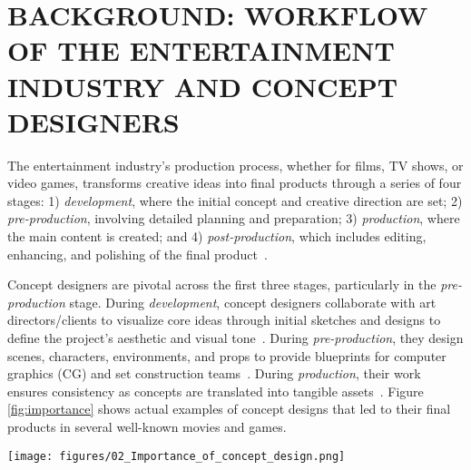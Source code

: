 \section{BACKGROUND: WORKFLOW OF THE ENTERTAINMENT INDUSTRY AND CONCEPT DESIGNERS}
The entertainment industry's production process, whether for films, TV shows, or video games, transforms creative ideas into final products through a series of four stages: 1) \textit{development}, where the initial concept and creative direction are set; 2) \textit{pre-production}, involving detailed planning and preparation; 3) \textit{production}, where the main content is created; and 4) \textit{post-production}, which includes editing, enhancing, and polishing of the final product~\cite{gameworkshop2018, bigbadWorld2015, directing2020, Singh2023Artificial, filmmaker2019}.

Concept designers are pivotal across the first three stages, particularly in the \textit{pre-production} stage. During \textit{development}, concept designers collaborate with art directors/clients to visualize core ideas through initial sketches and designs to define the project's aesthetic and visual tone~\cite{artofgame2008}. During \textit{pre-production}, they design scenes, characters, environments, and props to provide blueprints for computer graphics (CG) and set construction teams~\cite{gameworkshop2018, levelup2014}. During \textit{production}, their work ensures consistency as concepts are translated into tangible assets~\cite{bigbadWorld2015, randomguidebook2023}. Figure \ref{fig:importance} shows actual examples of concept designs that led to their final products in several well-known movies and games.

\begin{figure*}
    \centering
    \texttt{[image: figures/02\_Importance\_of\_concept\_design.png]}
    \caption{The figure showcases designs from concept to final product, including four well-known projects: (a) a scene from Star Wars, (b) characters from DC Comics (Harley Quinn, the Joker, and the Penguin), (c) a prop from Mad Max: Fury Road, and (d) a creature from Genshin Impact. This demonstrates the critical role of concept designers in shaping the creative vision from the earliest production stages to the final product}
    \label{fig:importance}
\end{figure*}


